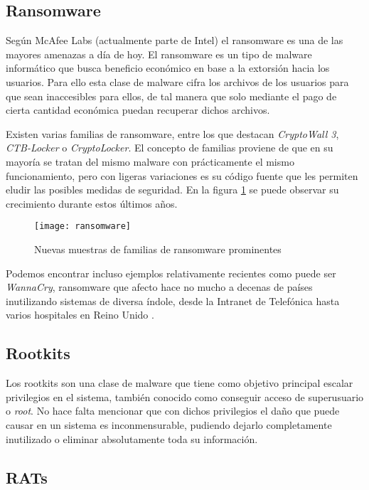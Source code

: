 \subsection{Ransomware}

Según McAfee Labs \cite{mcafee-predictions} (actualmente parte de Intel) el ransomware es una de las mayores amenazas a día de hoy. El ransomware es un tipo de malware informático que busca beneficio económico en base a la extorsión hacia los usuarios. Para ello esta clase de malware cifra los archivos de los usuarios para que sean inaccesibles para ellos, de tal manera que solo mediante el pago de cierta cantidad económica puedan recuperar dichos archivos.

Existen varias familias de ransomware, entre los que destacan \emph{CryptoWall 3}, \emph{CTB-Locker} o \emph{CryptoLocker}. El concepto de familias proviene de que en su mayoría se tratan del mismo malware con prácticamente el mismo funcionamiento, pero con ligeras variaciones es su código fuente que les permiten eludir las posibles medidas de seguridad. En la figura \ref{fig:ransomware} se puede observar su crecimiento durante estos últimos años.

\begin{figure}[H]
	\centering
	\texttt{[image: ransomware]}
	\caption{Nuevas muestras de familias de ransomware prominentes \cite{mcafee-predictions}}
	\label{fig:ransomware}
\end{figure}

Podemos encontrar incluso ejemplos relativamente recientes como puede ser \textit{WannaCry}, ransomware que afecto hace no mucho a decenas de países inutilizando sistemas de diversa índole, desde la Intranet de Telefónica hasta varios hospitales en Reino Unido \cite{wannacry1} \cite{wannacry2}.


\subsection{Rootkits}

Los rootkits son una clase de malware que tiene como objetivo principal escalar privilegios en el sistema, también conocido como conseguir acceso de superusuario o \textit{root}. No hace falta mencionar que con dichos privilegios el daño que puede causar en un sistema es inconmensurable, pudiendo dejarlo completamente inutilizado o eliminar absolutamente toda su información.

\subsection{RATs}

